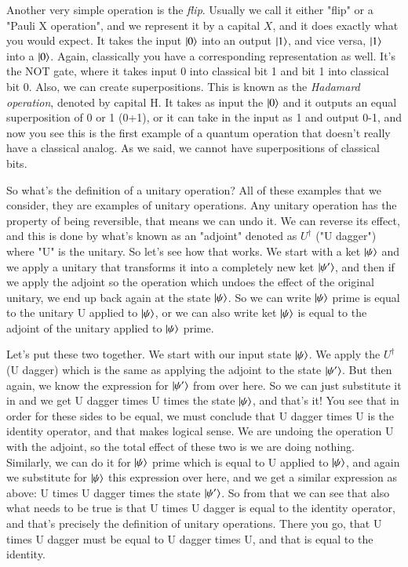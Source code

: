 Another very simple operation is the \emph{flip}. Usually we call it either "flip" or a "Pauli X operation", and we represent it by a capital $X$, and it does exactly what you would expect. It takes the input $\ket{0}$ into an output $\ket{1}$, and vice versa, $\ket{1}$ into a $\ket{0}$. Again, classically you have a corresponding representation as well. It's the NOT gate, where it takes input 0 into classical bit 1 and bit 1 into classical bit 0. Also, we can create superpositions. This is known as the \emph{Hadamard operation}, denoted by capital H. It takes as input the $\ket{0}$ and it outputs an equal superposition of 0 or 1 (0+1), or it can take in the input as 1 and output 0-1, and now you see this is the first example of a quantum operation that doesn't really have a classical analog. As we said, we cannot have superpositions of classical bits.

So what's the definition of a unitary operation? All of these examples that we consider, they are examples of unitary operations. Any unitary operation has the property of being reversible, that means we can undo it. We can reverse its effect, and this is done by what's known as an "adjoint" denoted as $U^\dagger$ ("U dagger") where "U" is the unitary.
So let's see how that works. We start with a ket $\ket{\psi}$ and we apply a unitary that transforms it into a completely new ket $\ket{\psi'}$, and then if we apply the adjoint so the operation which undoes the effect of the original unitary, we end up back again at the state $\ket{\psi}$. So we can write $\ket{\psi}$ prime is equal to the unitary U applied to $\ket{\psi}$, or we can also write ket $\ket{\psi}$ is equal to the adjoint of the unitary applied to $\ket{\psi}$ prime. 

Let's put these two together. We start with our input state $\ket{\psi}$. We apply the $U^\dagger$ (U dagger) which is the same as applying the adjoint to the state $\ket{\psi'}$. But then again, we know the expression for $\ket{\psi'}$ from over here. So we can just substitute it in and we get U dagger times U times the state $\ket{\psi}$, and that's it! You see that in order for these sides to be equal, we must conclude that U dagger times U is the identity operator, and that makes logical sense. We are undoing the operation U with the adjoint, so the total effect of these two is we are doing nothing. Similarly, we can do it for $\ket{\psi}$ prime which is equal to U applied to $\ket{\psi}$, and again we substitute for $\ket{\psi}$ this expression over here, and we get a similar expression as above: U times U dagger times the state $\ket{\psi'}$. So from that we can see that also what needs to be true is that U times U dagger is equal to the identity operator, and that's precisely the definition of unitary operations. There you go, that U times U dagger must be equal to U dagger times U, and that is equal to the identity. 

